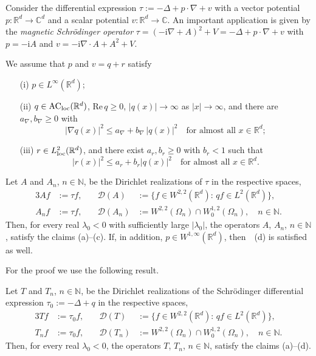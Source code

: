\documentclass[a4paper,reqno]{amsart}
\begin{document}
Consider the differential expression $\tau:=-\Delta+p\cdot\nabla+v$ with a vector potential $p:{\mathbb{R}}^d\to{\mathbb{C}}^d$ and a scalar potential $v:{\mathbb{R}}^d\to{\mathbb{C}}$.
An important application is given by the \emph{magnetic Schr\"odinger operator} $\tau=(-{\mathrm{i}}\nabla+ A)^2+V=-\Delta+p\cdot\nabla+v$ with $p=-{\mathrm{i}} A$ and $v=-{\mathrm{i}}\nabla\cdot A+A^2+V$.

We assume that $p$ and $v=q+r$ satisfy 
\begin{enumerate}
\item[\rm (i)]  $p\in L^{\infty}({\mathbb{R}}^d)$;
\item[\rm (ii)] $q\in{\rm AC_{loc}}({\mathbb{R}}^d)$, ${\mathrm{Re}}\,q\geq 0$, $|q(x)|\to\infty$ as $|x|\to\infty$, and there are $a_{\nabla},b_{\nabla}\geq 0$ with 
\begin{equation} \label{eq.nabla}|\nabla q(x)|^2\leq a_{\nabla} + b_{\nabla}\, |q(x)|^2\quad \text{for almost all } x\in{\mathbb{R}}^d;\end{equation}
\item[\rm (iii)] $r\in L^2_{\rm loc}({\mathbb{R}}^d)$, and
there exist $a_r,b_r\geq 0$ with $b_r<1$ such that
\begin{equation} |r(x)|^2\leq a_r + b_r |q(x)|^2 \quad\text{for almost all } x\in{\mathbb{R}}^d.\label{eq.relbddpot}\end{equation}
\end{enumerate}

\begin{theorem}\label{thm.schroed}
Let $A$ and $A_n$, $n\in{\mathbb{N}}$, be the Dirichlet realizations of $\tau $ in the respective spaces,
\begin{alignat*}{3}
Af&:=\tau f, \quad& {\mathcal D}(A)&:=
\big\{f\in W^{2,2}({\mathbb{R}}^d):\,qf\in L^2({\mathbb{R}}^d)\big\},\\
A_nf&:=\tau f, \quad& {\mathcal D}(A_n)&:=
W^{2,2}(\Omega_n)\cap W_0^{1,2}(\Omega_n), \quad n\in{\mathbb{N}}.
\end{alignat*}
Then, for every real $\lambda_0<0$ with sufficiently large $|\lambda_0|$, the operators $A$, $A_n$, $n\in{\mathbb{N}}$, satisfy the claims  {\rm (a)--(c)}.
If, in addition, $p\in W^{1,\infty}({\mathbb{R}}^d)$, then~{\rm~(d)} is satisfied as well.
\end{theorem}

For the proof we use the following result.

\begin{lemma}\label{lemma.schroed}
Let $T$ and $T_n$, $n\in{\mathbb{N}}$, be the Dirichlet realizations of  the Schr\"odinger differential expression $\tau_0:=-\Delta+q$ in the respective spaces,
\begin{alignat*}{3}
 Tf&:=\tau_0 f, \quad& {\mathcal D}(T)&:=
\big\{f\in W^{2,2}({\mathbb{R}}^d):\,qf\in L^2({\mathbb{R}}^d)\big\},\\
 T_nf&:=\tau_0 f, \quad& {\mathcal D}(T_n)&:=
W^{2,2}(\Omega_n)\cap W_0^{1,2}(\Omega_n), \quad n\in{\mathbb{N}}.
\end{alignat*}
Then,  for every real $\lambda_0<0$, the operators $T$, $T_n$, $n\in{\mathbb{N}}$, satisfy the claims  {\rm (a)--(d)}.
\end{lemma}
\end{document}
